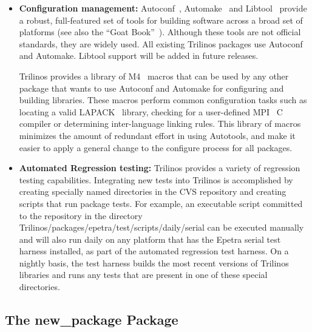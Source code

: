 \documentclass[12pt,relax]{TPA}
\begin{document}
\begin{itemize}
\item {\bf Configuration management:}
Autoconf~\cite{Autoconf},  Automake~\cite{Automake} and
Libtool~\cite{Libtool} provide a robust, full-featured set of tools for
building software across a broad set of platforms (see also the ``Goat
Book''~\cite{GoatBook}).  Although these
tools are not official standards, they are widely used.  All existing
Trilinos packages use Autoconf and Automake.  Libtool support will be
added in future releases. 

Trilinos provides a library of M4~\cite{M4} macros that can be used by any other
package that wants to use Autoconf and Automake for configuring and
building libraries.  These macros perform common configuration tasks such as
locating a valid LAPACK~\cite{lapack} library, checking for a
user-defined MPI~\cite{MPI} C compiler or determining inter-language linking
rules.  This library of macros minimizes the amount of redundant
 effort in using Autotools, and make it easier to apply a general change to
the configure process for all packages.

\item {\bf Automated Regression testing:} Trilinos provides a variety
of  regression testing capabilities.
Integrating new tests into Trilinos is accomplished by creating
specially named directories in the CVS repository and creating scripts
that run package tests.  For example, an executable script committed
to the repository in the directory 
Trilinos/packages/epetra/test/scripts/daily/serial can be executed manually and
will also run daily on any platform that has the Epetra serial test harness
installed, as part of the automated regression test harness.  On a nightly 
basis, the test harness builds the most recent versions of Trilinos libraries 
and runs any tests that are present in one of these special directories.  
\end{itemize}

\subsection{The new\_package Package} 
\end{document}
